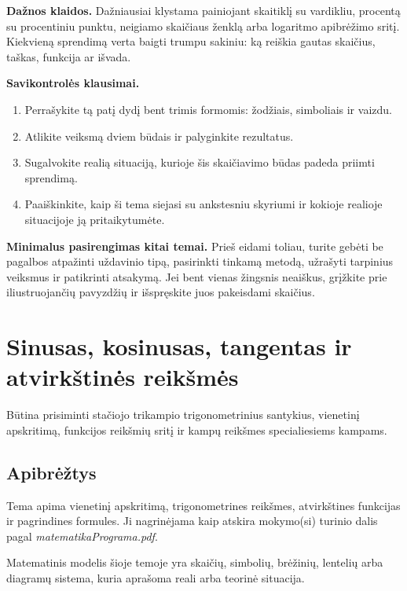 \textbf{Dažnos klaidos.} Dažniausiai klystama painiojant skaitiklį su vardikliu, procentą su procentiniu punktu, neigiamo skaičiaus ženklą arba logaritmo apibrėžimo sritį. Kiekvieną sprendimą verta baigti trumpu sakiniu: ką reiškia gautas skaičius, taškas, funkcija ar išvada.

\textbf{Savikontrolės klausimai.}
\begin{enumerate}[label=\arabic*.]
\item Perrašykite tą patį dydį bent trimis formomis: žodžiais, simboliais ir vaizdu.
\item Atlikite veiksmą dviem būdais ir palyginkite rezultatus.
\item Sugalvokite realią situaciją, kurioje šis skaičiavimo būdas padeda priimti sprendimą.
\item Paaiškinkite, kaip ši tema siejasi su ankstesniu skyriumi ir kokioje realioje situacijoje ją pritaikytumėte.
\end{enumerate}

\textbf{Minimalus pasirengimas kitai temai.} Prieš eidami toliau, turite gebėti be pagalbos atpažinti uždavinio tipą, pasirinkti tinkamą metodą, užrašyti tarpinius veiksmus ir patikrinti atsakymą. Jei bent vienas žingsnis neaiškus, grįžkite prie iliustruojančių pavyzdžių ir išspręskite juos pakeisdami skaičius.

\section{Sinusas, kosinusas, tangentas ir atvirkštinės reikšmės}\label{sec:sinusas-kosinusas-tangentas-ir-atvirkstines-reiksmes}

\begin{tcolorbox}[title=Prieš pradedant, colback=green!5]
Būtina prisiminti stačiojo trikampio trigonometrinius santykius, vienetinį apskritimą, funkcijos reikšmių sritį ir kampų reikšmes specialiesiems kampams.
\end{tcolorbox}
\subsection{Apibrėžtys}
\begin{apibreztis}
Tema apima vienetinį apskritimą, trigonometrines reikšmes, atvirkštines funkcijas ir pagrindines formules. Ji nagrinėjama kaip atskira mokymo(si) turinio dalis pagal \emph{matematikaPrograma.pdf}.
\end{apibreztis}
\begin{apibreztis}
Matematinis modelis šioje temoje yra skaičių, simbolių, brėžinių, lentelių arba diagramų sistema, kuria aprašoma reali arba teorinė situacija.
\end{apibreztis}


